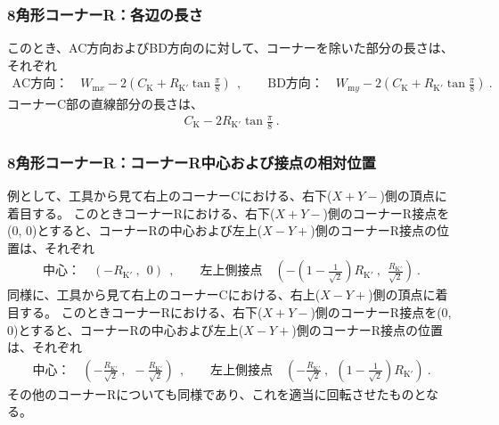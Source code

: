 \subsubsection{8角形コーナーR：各辺の長さ}
このとき、AC方向およびBD方向の\KeywayWidth に対して、コーナーを除いた部分の長さは、それぞれ
\begin{align*}
  \text{AC方向：}\quad W_{\mathrm mx}-2\left(C_\mathrm K+R_\mathrm{K'}\tan\frac\pi8\right)~~, \qquad
  \text{BD方向：}\quad W_{\mathrm my}-2\left(C_\mathrm K+R_\mathrm{K'}\tan\frac\pi8\right)\ .
\end{align*}
コーナーC部の直線部分の長さは、
\begin{align*}
  C_\mathrm K-2R_\mathrm{K'}\tan\frac\pi8\ .
\end{align*}

\subsubsection{8角形コーナーR：コーナーR中心および接点の相対位置}
例として、工具から見て右上のコーナーCにおける、右下($X+Y-$)側の頂点に着目する。
このときコーナーRにおける、右下($X+Y-$)側のコーナーR接点を(0, 0)とすると、コーナーRの中心および左上($X-Y+$)側のコーナーR接点の位置は、それぞれ
\begin{align*}
  \text{中心：}\quad \left(-R_\mathrm{K'}~,~~0\right)~~,\qquad
  \text{左上側接点}\quad \left(-\left(1-\frac1{\sqrt2}\right)R_\mathrm{K'}~,~~\frac{R_\mathrm{K'}}{\sqrt2}\right)\ .
\end{align*}
同様に、工具から見て右上のコーナーCにおける、右上($X-Y+$)側の頂点に着目する。
このときコーナーRにおける、右下($X+Y-$)側のコーナーR接点を(0, 0)とすると、コーナーRの中心および左上($X-Y+$)側のコーナーR接点の位置は、それぞれ
\begin{align*}
  \text{中心：}\quad \left(-\frac{R_\mathrm{K'}}{\sqrt2}~,~~-\frac{R_\mathrm{K'}}{\sqrt2}\right)~~,\qquad
  \text{左上側接点}\quad \left(-\frac{R_\mathrm{K'}}{\sqrt2}~,~~\left(1-\frac1{\sqrt2}\right)R_\mathrm{K'}\right)\ .
\end{align*}
その他のコーナーRについても同様であり、これを適当に回転させたものとなる。
